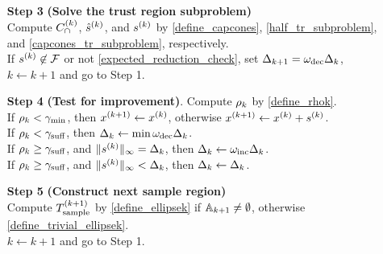 {\begin{fullwidth}[leftmargin=0in, rightmargin=0in, width=\linewidth-0.25in]
\begin{flushleft}
\begin{algorithm}[H]
\begin{itemize}
		
        \item[\textbf{Step 3}] \textbf{(Solve the trust region subproblem)} \\
        	Compute ${C^{(k)}_{\cap}}$, ${{\hat s}^{(k)}}$, and ${{s}^{(k)}}$ by
        	\cref{define_capcones}, \cref{half_tr_subproblem}, and \cref{capcones_tr_subproblem}, respectively. \\
        	If ${{s}^{(k)}} \not \in {\mathcal F}$ or not \cref{expected_reduction_check}, set $\Delta_{k+1} = \omega_{\text{dec}}\Delta_k$, $k \gets k+1$ and go to Step 1.
		
        \item[\textbf{Step 4}] \textbf{(Test for improvement)}.
        	Compute $\rho_k$ by \cref{define_rhok}. \\
			If $\rho_k < \gamma_{\textrm{min}}$, then ${{x}^{(k+1)}} \gets x^{(k)}$, otherwise ${{x}^{(k+1)}} \gets x^{(k)} + {{s}^{(k)}}$. \\
            If $\rho_k < \gamma_{\textrm{suff}}$, then $\Delta_k \gets \min\omega_{\text{dec}}\Delta_k$. \\
            If $\rho_k \ge \gamma_{\textrm{suff}}$, and $\|{{s}^{(k)}}\|_{\infty} = \Delta_k$, then $\Delta_k \gets \omega_{\text{inc}}\Delta_k$. \\
            If $\rho_k \ge \gamma_{\textrm{suff}}$, and $\|{{s}^{(k)}}\|_{\infty} < \Delta_k$, then $\Delta_k \gets \Delta_k$.
            
		
        \item[\textbf{Step 5}] \textbf{(Construct next sample region)} \\
        	Compute ${T_{\text{sample}}^{(k+1)}}$ by \cref{define_ellipsek} if ${\mathbb A_{k+1}} \ne \emptyset$, otherwise \cref{define_trivial_ellipsek}. \\
            $k \gets k+1$ and go to Step 1.
            
% 		
% 		
    \end{itemize}
\end{algorithm}

\end{flushleft}
\end{fullwidth}
}

